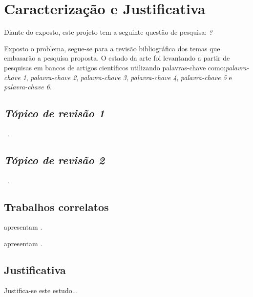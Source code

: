 \section{Caracterização e Justificativa}
\label{sec:caracterizacao_justificativa}

Diante do exposto, este projeto tem a seguinte questão de pesquisa: \textit{\lipsum[20]?}




Exposto o problema, segue-se para a revisão bibliográfica dos temas que embasarão a pesquisa proposta. O estado da arte foi levantando a partir de pesquisas em bancos de artigos científicos utilizando palavras-chave como:\textit{palavra-chave 1}, \textit{palavra-chave 2}, \textit{palavra-chave 3}, \textit{palavra-chave 4}, \textit{palavra-chave 5} e  \textit{palavra-chave 6}.

\subsection{\textit{Tópico de revisão 1}} \label{subsec:topico_revisao_1}

\lipsum[30-33]~\cite{inbook,proceedings}.

\subsection{\textit{Tópico de revisão 2}} \label{subsec:topico_revisao_2}

\lipsum[40-43]~\cite{book}.

\subsection{Trabalhos correlatos}\label{subsec:trabalhos_correlatos}

\citet{article} apresentam \lipsum[38].

\citet{manual} apresentam \lipsum[39].


\subsection{Justificativa}

Justifica-se este estudo...\lipsum[50]